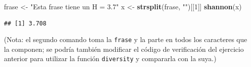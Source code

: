 \documentclass[]{article}
\newenvironment{Shaded}{}{}
\newcommand{\KeywordTok}[1]{\textcolor[rgb]{0.00,0.44,0.13}{\textbf{{#1}}}}
\newcommand{\DecValTok}[1]{\textcolor[rgb]{0.25,0.63,0.44}{{#1}}}
\newcommand{\StringTok}[1]{\textcolor[rgb]{0.25,0.44,0.63}{{#1}}}
\newcommand{\NormalTok}[1]{{#1}}
\begin{document}
\begin{Shaded}
\begin{Highlighting}[]
\NormalTok{frase <- }\StringTok{"Esta frase tiene un H = 3.7"}
\NormalTok{x <- }\KeywordTok{strsplit}\NormalTok{(frase, }\StringTok{""}\NormalTok{)[[}\DecValTok{1}\NormalTok{]]}
\KeywordTok{shannon}\NormalTok{(x)}
\end{Highlighting}
\end{Shaded}
\begin{verbatim}
## [1] 3.708
\end{verbatim}
(Nota: el segundo comando toma la \texttt{frase} y la parte en todos los
caracteres que la componen; se podría también modificar el código de
verificación del ejercicio anterior para utilizar la función
\texttt{diversity} y compararla con la suya.)
\end{document}
